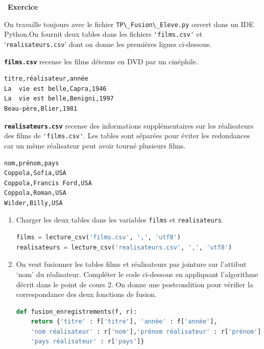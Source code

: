 \documentclass[
  11pt,
]{article}
\newcommand{\passthrough}[1]{#1}
\newcounter{exo}
\newenvironment{exercice}[1]
{\par \medskip   \addtocounter{exo}{1} \noindent  
\begin{bclogo}[arrondi =0.1,   noborder = true, logo=\bccrayon, marge=4]{~\textbf{Exercice} \textbf{\theexo} {\itshape #1} }  \par}
{
\end{bclogo}
 \par \bigskip }
\newcounter{thme}
\newcounter{def}
\newcounter{cours}
\newcounter{alg}
\begin{document}
\begin{exercice}{}

On travaille toujours avec le fichier
\passthrough{\lstinline!TP\_Fusion\_Eleve.py!} ouvert dans un IDE
Python.On fournit deux tables dans les fichiers
\passthrough{\lstinline!'films.csv'!} et
`\passthrough{\lstinline!realisateurs.csv!}' dont on donne les premières
lignes ci-dessous.

\textbf{\passthrough{\lstinline!films.csv!}} recense les films détenus
en DVD par un cinéphile.

\begin{lstlisting}
titre,réalisateur,année
La  vie est belle,Capra,1946
La  vie est belle,Benigni,1997
Beau-père,Blier,1981
\end{lstlisting}

\textbf{\passthrough{\lstinline!realisateurs.csv!}} recense des
informations supplémentaires sur les réalisateurs des films de
\passthrough{\lstinline!'films.csv'!}. Les tables sont séparées pour
éviter les redondances car un même réalisateur peut avoir tourné
plusieurs films.

\begin{lstlisting}
nom,prénom,pays
Coppola,Sofia,USA
Coppola,Francis Ford,USA
Coppola,Roman,USA
Wilder,Billy,USA
\end{lstlisting}

\begin{enumerate}
\def\labelenumi{\arabic{enumi}.}
\item
  Charger les deux tables dans les variables
  \passthrough{\lstinline!films!} et
  \passthrough{\lstinline!realisateurs!}.

\begin{lstlisting}[language=Python]
films = lecture_csv('films.csv', ',', 'utf8')
realisateurs = lecture_csv('realisateurs.csv', ',', 'utf8')
\end{lstlisting}
\item
  On veut fusionner les tables films et réalisateurs par jointure sur
  l'attibut `nom' du réalisateur. Compléter le code ci-dessous en
  appliquant l'algorithme décrit dans le point de cours 2. On donne une
  postcondition pour vérifier la correspondance des deux fonctions de
  fusion.

\begin{lstlisting}[language=Python]
def fusion_enregistrements(f, r):
    return {'titre' : f['titre'], 'année' : f['année'], 
    'nom réalisateur' : r['nom'],'prénom réalisateur' : r['prénom'],
    'pays réalisateur' : r['pays']}


\end{lstlisting}
\end{enumerate}
\end{exercice}
\end{document}
